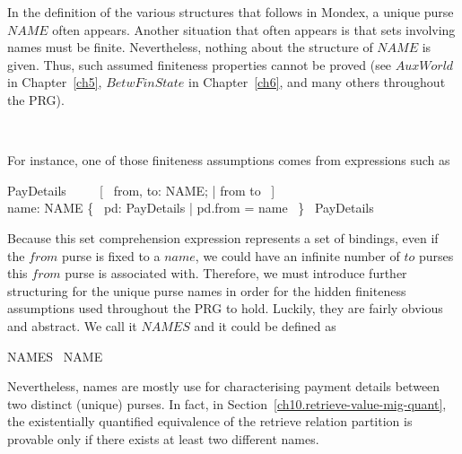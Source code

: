 In the definition of the various structures that follows in Mondex,
a unique purse $NAME$ often appears. Another situation that often appears
is that sets involving names must be finite. Nevertheless, nothing about the
structure of $NAME$ is given. Thus, such assumed finiteness properties
cannot be proved (see $AuxWorld$ in Chapter~\ref{ch5}, $BetwFinState$ in Chapter~\ref{ch6},
and many others throughout the PRG).
%
\begin{LGSet}
\begin{zed}
  [NAME]
\end{zed}~\end{LGSet}
%
For instance, one of those finiteness assumptions comes from expressions such as
%
\begin{gzed}
   PayDetails ~~~~ [~ from, to: NAME; \cdots | from \neq to ~]
   \\
   name: NAME \shows \{~ pd: PayDetails | pd.from = name ~\} \in \finset~PayDetails
\end{gzed}
%
Because this set comprehension expression represents a set of bindings, even
if the $from$ purse is fixed to a $name$, we could have an infinite number of
$to$ purses this $from$ purse is associated with. Therefore, we must introduce
further structuring for the unique purse names in order for the hidden finiteness
assumptions used throughout the PRG to hold. Luckily, they are fairly obvious and
abstract. We call it $NAMES$ and it could be defined as
%
\begin{gzed}
   NAMES \in \finset~NAME
\end{gzed}
%
Nevertheless, names are mostly use for characterising payment details between two
distinct (unique) purses. In fact, in Section~\ref{ch10.retrieve-value-mig-quant},
the existentially quantified equivalence of the retrieve relation partition is
provable only if there exists at least two different names.

